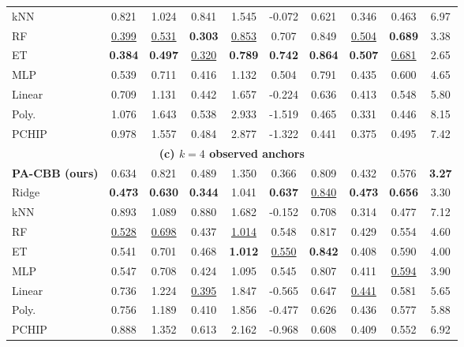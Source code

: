 \begin{table}[!t]
{\begin{tabular}{l*{9}{c}}
kNN & 0.821 & 1.024 & 0.841 & 1.545 & -0.072 & 0.621 & 0.346 & 0.463 & 6.97 \\
RF & \underline{0.399} & \underline{0.531} & \textbf{0.303} & \underline{0.853} & 0.707 & 0.849 & \underline{0.504} & \textbf{0.689} & 3.38 \\
ET & \textbf{0.384} & \textbf{0.497} & \underline{0.320} & \textbf{0.789} & \textbf{0.742} & \textbf{0.864} & \textbf{0.507} & \underline{0.681} & 2.65 \\
MLP & 0.539 & 0.711 & 0.416 & 1.132 & 0.504 & 0.791 & 0.435 & 0.600 & 4.65 \\
Linear & 0.709 & 1.131 & 0.442 & 1.657 & -0.224 & 0.636 & 0.413 & 0.548 & 5.80 \\
Poly. & 1.076 & 1.643 & 0.538 & 2.933 & -1.519 & 0.465 & 0.331 & 0.446 & 8.15 \\
PCHIP & 0.978 & 1.557 & 0.484 & 2.877 & -1.322 & 0.441 & 0.375 & 0.495 & 7.42 \\
\midrule
\multicolumn{10}{c}{\textbf{(c) $k=4$ observed anchors}} \\
\midrule
\textbf{PA-CBB (ours)} & 0.634 & 0.821 & 0.489 & 1.350 & 0.366 & 0.809 & 0.432 & 0.576 & \textbf{3.27} \\
Ridge & \textbf{0.473} & \textbf{0.630} & \textbf{0.344} & 1.041 & \textbf{0.637} & \underline{0.840} & \textbf{0.473} & \textbf{0.656} & 3.30 \\
kNN & 0.893 & 1.089 & 0.880 & 1.682 & -0.152 & 0.708 & 0.314 & 0.477 & 7.12 \\
RF & \underline{0.528} & \underline{0.698} & 0.437 & \underline{1.014} & 0.548 & 0.817 & 0.429 & 0.554 & 4.60 \\
ET & 0.541 & 0.701 & 0.468 & \textbf{1.012} & \underline{0.550} & \textbf{0.842} & 0.408 & 0.590 & 4.00 \\
MLP & 0.547 & 0.708 & 0.424 & 1.095 & 0.545 & 0.807 & 0.411 & \underline{0.594} & 3.90 \\
Linear & 0.736 & 1.224 & \underline{0.395} & 1.847 & -0.565 & 0.647 & \underline{0.441} & 0.581 & 5.65 \\
Poly. & 0.756 & 1.189 & 0.410 & 1.856 & -0.477 & 0.626 & 0.436 & 0.577 & 5.88 \\
PCHIP & 0.888 & 1.352 & 0.613 & 2.162 & -0.968 & 0.608 & 0.409 & 0.552 & 6.92 \\
\bottomrule
\end{tabular}%
}
\end{table}
